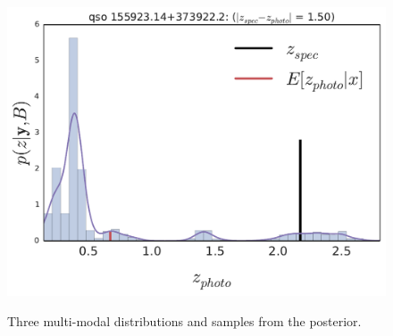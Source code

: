 \documentclass{article}
\begin{document}
\begin{figure}[t]
{\includegraphics[width=.56\columnwidth]{../../figs/quasar_plots/quasar_554_posterior_z}
}
\vskip -0.2in
\caption{ Three multi-modal distributions and samples from the posterior.}
\label{fig:multi}
\vskip -0.2in
\end{figure}
%
%
%
\end{document}
